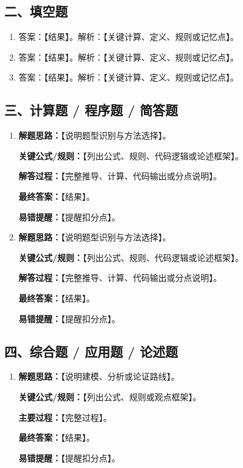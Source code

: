 \documentclass[UTF8,12pt,a4paper]{ctexart}
\begin{document}
\subsection*{二、填空题}
\begin{enumerate}
\item 答案：【结果】。解析：【关键计算、定义、规则或记忆点】。
\item 答案：【结果】。解析：【关键计算、定义、规则或记忆点】。
\item 答案：【结果】。解析：【关键计算、定义、规则或记忆点】。
\end{enumerate}

\subsection*{三、计算题 / 程序题 / 简答题}
\begin{enumerate}
\item
\textbf{解题思路：}【说明题型识别与方法选择】。\par
\textbf{关键公式/规则：}【列出公式、规则、代码逻辑或论述框架】。\par
\textbf{解答过程：}【完整推导、计算、代码输出或分点说明】。\par
\textbf{最终答案：}【结果】。\par
\textbf{易错提醒：}【提醒扣分点】。

\item
\textbf{解题思路：}【说明题型识别与方法选择】。\par
\textbf{关键公式/规则：}【列出公式、规则、代码逻辑或论述框架】。\par
\textbf{解答过程：}【完整推导、计算、代码输出或分点说明】。\par
\textbf{最终答案：}【结果】。\par
\textbf{易错提醒：}【提醒扣分点】。
\end{enumerate}

\subsection*{四、综合题 / 应用题 / 论述题}
\begin{enumerate}
\item
\textbf{解题思路：}【说明建模、分析或论证路线】。\par
\textbf{关键公式/规则：}【列出公式、规则或观点框架】。\par
\textbf{主要过程：}【完整过程】。\par
\textbf{最终答案：}【结果】。\par
\textbf{易错提醒：}【提醒扣分点】。
\end{enumerate}
\end{document}
